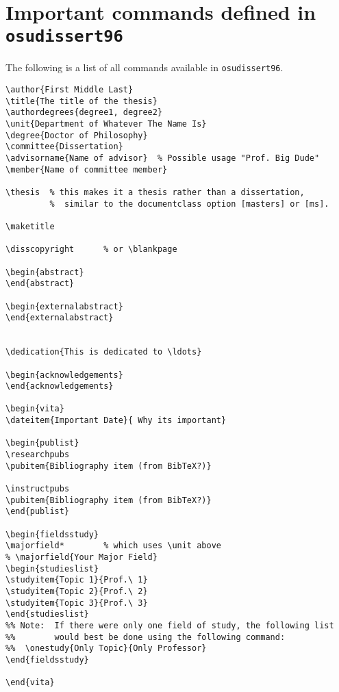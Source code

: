\chapter{Important commands defined in {\tt osudissert96}}
\label{allcommands:app}

The following is a list of all commands available in {\tt osudissert96}.


{\baselineskip=15pt
\begin{verbatim}
\author{First Middle Last}
\title{The title of the thesis}
\authordegrees{degree1, degree2}
\unit{Department of Whatever The Name Is}
\degree{Doctor of Philosophy}
\committee{Dissertation}
\advisorname{Name of advisor}  % Possible usage "Prof. Big Dude"
\member{Name of committee member}

\thesis  % this makes it a thesis rather than a dissertation,
         %  similar to the documentclass option [masters] or [ms].

\maketitle

\disscopyright      % or \blankpage

\begin{abstract}
\end{abstract}

\begin{externalabstract}
\end{externalabstract}


\dedication{This is dedicated to \ldots}

\begin{acknowledgements}
\end{acknowledgements}

\begin{vita}
\dateitem{Important Date}{ Why its important}

\begin{publist}
\researchpubs
\pubitem{Bibliography item (from BibTeX?)}

\instructpubs
\pubitem{Bibliography item (from BibTeX?)}
\end{publist}

\begin{fieldsstudy}
\majorfield*        % which uses \unit above
% \majorfield{Your Major Field}
\begin{studieslist}
\studyitem{Topic 1}{Prof.\ 1}
\studyitem{Topic 2}{Prof.\ 2}
\studyitem{Topic 3}{Prof.\ 3}
\end{studieslist}
%% Note:  If there were only one field of study, the following list 
%%        would best be done using the following command:
%%  \onestudy{Only Topic}{Only Professor}
\end{fieldsstudy}

\end{vita}
\end{verbatim}
}
